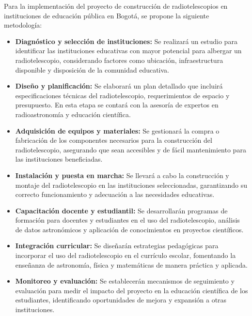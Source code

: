 Para la implementación del proyecto de construcción de radiotelescopios en
instituciones de educación pública en Bogotá, se propone la siguiente
metodología:

\begin{itemize}

  \item \textbf{Diagnóstico y selección de instituciones:} Se realizará un
    estudio para identificar las instituciones educativas con mayor potencial
    para albergar un radiotelescopio, considerando factores como ubicación,
    infraestructura disponible y disposición de la comunidad educativa.

  \item \textbf{Diseño y planificación:} Se elaborará un plan detallado que
    incluirá especificaciones técnicas del radiotelescopio, requerimientos de
    espacio y presupuesto. En esta etapa se contará con la asesoría de expertos
    en radioastronomía y educación científica.

  \item \textbf{Adquisición de equipos y materiales:} Se gestionará la compra o
    fabricación de los componentes necesarios para la construcción del
    radiotelescopio, asegurando que sean accesibles y de fácil mantenimiento
    para las instituciones beneficiadas.

  \item \textbf{Instalación y puesta en marcha:} Se llevará a cabo la
    construcción y montaje del radiotelescopio en las instituciones
    seleccionadas, garantizando su correcto funcionamiento y adecuación a las
    necesidades educativas.

  \item \textbf{Capacitación docente y estudiantil:} Se desarrollarán programas
    de formación para docentes y estudiantes en el uso del radiotelescopio,
    análisis de datos astronómicos y aplicación de conocimientos en proyectos
    científicos.

  \item \textbf{Integración curricular:} Se diseñarán estrategias pedagógicas
    para incorporar el uso del radiotelescopio en el currículo escolar,
    fomentando la enseñanza de astronomía, física y matemáticas de manera
    práctica y aplicada.

  \item \textbf{Monitoreo y evaluación:} Se establecerán mecanismos de
    seguimiento y evaluación para medir el impacto del proyecto en la educación
    científica de los estudiantes, identificando oportunidades de mejora y
    expansión a otras instituciones.

\end{itemize}
